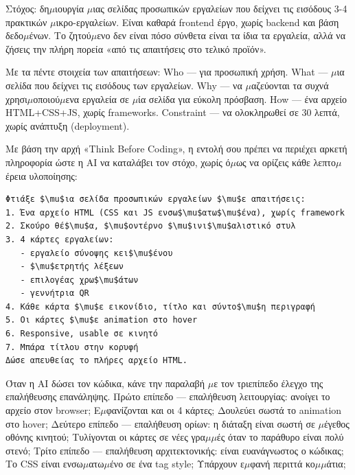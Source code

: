 



Στόχος: δη$\mu$ιουργία $\mu$ιας σελίδας προσωπικών εργαλείων που δείχνει τις εισόδους 3-4 πρακτικών $\mu$ικρο-εργαλείων. Είναι καθαρά frontend έργο, χωρίς backend και βάση δεδο$\mu$ένων. Το ζητού$\mu$ενο δεν είναι πόσο σύνθετα είναι τα ίδια τα εργαλεία, αλλά να ζήσεις την πλήρη πορεία «από τις απαιτήσεις στο τελικό προϊόν».

Με τα πέντε στοιχεία των απαιτήσεων: Who — για προσωπική χρήση. What — $\mu$ια σελίδα που δείχνει τις εισόδους των εργαλείων. Why — να $\mu$αζεύονται τα συχνά χρησι$\mu$οποιού$\mu$ενα εργαλεία σε $\mu$ία σελίδα για εύκολη πρόσβαση. How — ένα αρχείο HTML+CSS+JS, χωρίς frameworks. Constraint — να ολοκληρωθεί σε 30 λεπτά, χωρίς ανάπτυξη (deployment).


Με βάση την αρχή «Think Before Coding», η εντολή σου πρέπει να περιέχει αρκετή πληροφορία ώστε η AI να καταλάβει τον στόχο, χωρίς ό$\mu$ως να ορίζεις κάθε λεπτο$\mu$έρεια υλοποίησης:

\begin{lstlisting}
Φτιάξε $\mu$ια σελίδα προσωπικών εργαλείων $\mu$ε απαιτήσεις:
1. Ένα αρχείο HTML (CSS και JS ενσω$\mu$ατω$\mu$ένα), χωρίς framework
2. Σκούρο θέ$\mu$α, $\mu$οντέρνο $\mu$ινι$\mu$αλιστικό στυλ
3. 4 κάρτες εργαλείων:
   - εργαλείο σύνοψης κει$\mu$ένου
   - $\mu$ετρητής λέξεων
   - επιλογέας χρω$\mu$άτων
   - γεννήτρια QR
4. Κάθε κάρτα $\mu$ε εικονίδιο, τίτλο και σύντο$\mu$η περιγραφή
5. Οι κάρτες $\mu$ε animation στο hover
6. Responsive, usable σε κινητό
7. Μπάρα τίτλου στην κορυφή
Δώσε απευθείας το πλήρες αρχείο HTML.
\end{lstlisting}


Όταν η AI δώσει τον κώδικα, κάνε την παραλαβή $\mu$ε τον τριεπίπεδο έλεγχο της επαλήθευσης επανάληψης. Πρώτο επίπεδο — επαλήθευση λειτουργίας: ανοίγει το αρχείο στον browser; Ε$\mu$φανίζονται και οι 4 κάρτες; Δουλεύει σωστά το animation στο hover; Δεύτερο επίπεδο — επαλήθευση ορίων: η διάταξη είναι σωστή σε $\mu$έγεθος οθόνης κινητού; Τυλίγονται οι κάρτες σε νέες γρα$\mu$$\mu$ές όταν το παράθυρο είναι πολύ στενό; Τρίτο επίπεδο — επαλήθευση αρχιτεκτονικής: είναι ευανάγνωστος ο κώδικας; Το CSS είναι ενσω$\mu$ατω$\mu$ένο σε ένα tag style; Υπάρχουν ε$\mu$φανή περιττά κο$\mu$$\mu$άτια;


